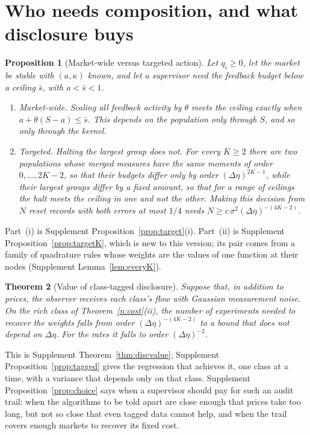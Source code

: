 \documentclass[12pt]{article}
\newtheorem{theorem}{Theorem}[section]
\newtheorem{proposition}[theorem]{Proposition}
\theoremstyle{definition}
\theoremstyle{remark}
\begin{document}
\section{Who needs composition, and what disclosure buys}\label{n:sup}

\begin{proposition}[Market-wide versus targeted action]\label{n:target}
Let $q_i\ge0$, let the market be stable with $(a,\kappa)$ known, and let a supervisor need the feedback budget below a ceiling $\bar s$, with $a<\bar s<1$.
\begin{enumerate}[label=(\roman*),itemsep=1pt]
\item \emph{Market-wide.} Scaling all feedback activity by $\theta$ meets the ceiling exactly when $a+\theta(S-a)\le\bar s$. This depends on the population only through $S$, and so only through the kernel.
\item \emph{Targeted.} Halting the largest group does not. For every $K\ge2$ there are two populations whose merged measures have the same moments of order $0,\ldots,2K-2$, so that their budgets differ only by order $(\Delta\eta)^{2K-1}$, while their largest groups differ by a fixed amount, so that for a range of ceilings the halt meets the ceiling in one and not the other. Making this decision from $N$ reset records with both errors at most $1/4$ needs $N\ge c\,\sigma^2(\Delta\eta)^{-(4K-2)}$.
\end{enumerate}
\end{proposition}

Part~(i) is Supplement Proposition~\ref{prop:target}(i). Part~(ii) is Supplement Proposition~\ref{prop:targetK}, which is new to this version; its pair comes from a family of quadrature rules whose weights are the values of one function at their nodes (Supplement Lemma~\ref{lem:everyK}).

\begin{theorem}[Value of class-tagged disclosure]\label{n:disc}
Suppose that, in addition to prices, the observer receives each class's flow with Gaussian measurement noise. On the rich class of Theorem~\ref{n:cost}(ii), the number of experiments needed to recover the weights falls from order $(\Delta\eta)^{-(4K-2)}$ to a bound that does not depend on $\Delta\eta$. For the rates it falls to order $(\Delta\eta)^{-2}$.
\end{theorem}

This is Supplement Theorem~\ref{thm:discvalue}; Supplement Proposition~\ref{prop:tagged} gives the regression that achieves it, one class at a time, with a variance that depends only on that class. Supplement Proposition~\ref{prop:choice} says when a supervisor should pay for such an audit trail: when the algorithms to be told apart are close enough that prices take too long, but not so close that even tagged data cannot help, and when the trail covers enough markets to recover its fixed cost.
\end{document}
